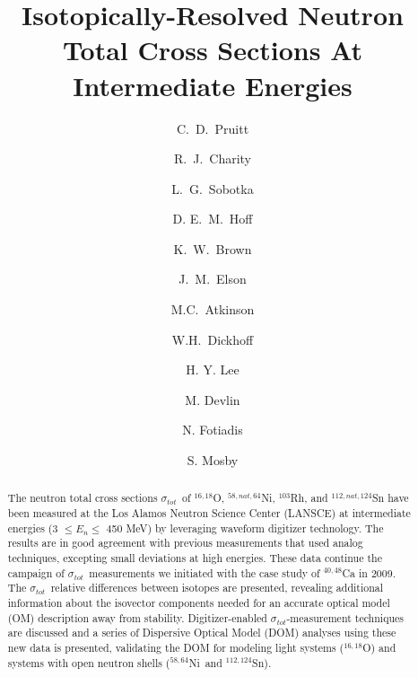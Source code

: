 \documentclass[twocolumn,secnumarabic,amssymb, nobibnotes, aps, prl,
superscriptaddress, nobalancelastpage]{revtex4}
\newcommand{\tot}{\ensuremath{\sigma_{tot}}}
\newcommand{\oSixEight}{\ensuremath{^{16,18}}O}
\newcommand{\niEightFour}{\ensuremath{^{58,64}}N\lowercase{i}}
\newcommand{\snTwelveFour}{\ensuremath{^{112,124}}S\lowercase{n}}
\begin{document}
\begin{abstract}
    The neutron total cross sections \tot\ of $^{16,18}$O,
    $^{58,nat,64}$Ni, $^{103}$Rh, and $^{112,nat,124}$Sn have been measured at the Los Alamos
    Neutron Science Center (LANSCE) at intermediate energies (3 $\leq E_{n}
    \leq$ 450 MeV) by
    leveraging waveform digitizer technology. The results are in good agreement
    with previous measurements that used analog techniques,
    excepting small deviations at high energies. These data
    continue the campaign of
    \tot\ measurements we initiated with the case study of $^{40,48}$Ca in 2009.
    The \tot\ relative differences between isotopes are presented,
    revealing additional information about
    the isovector components needed for an accurate optical model (OM)
    description away from stability. Digitizer-enabled \tot-measurement
    techniques are discussed and a series of Dispersive Optical Model (DOM)
    analyses using these new data is presented, validating the DOM for modeling light
    systems (\oSixEight) and systems with open neutron shells (\niEightFour\ and \snTwelveFour).
\end{abstract}

\title{Isotopically-Resolved Neutron Total Cross Sections At
Intermediate Energies}

\author{C.~D.~Pruitt}  
\author{R.~J.~Charity}
\author{L.~G.~Sobotka}
\author{D. E.~M.~Hoff}  

\author{K.~W.~Brown} 
\author{J.~M.~Elson}

\author{M.C.~Atkinson}
\author{W.H.~Dickhoff}

\author{H. Y. Lee}
\author{M. Devlin}
\author{N. Fotiadis}
\author{S. Mosby}
\maketitle
\end{document}

